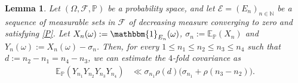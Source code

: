 \documentclass[11pt]{amsart}
\numberwithin{equation}{section}
\newtheorem{lemma}{Lemma}[section]
\theoremstyle{definition}
\theoremstyle{plain}
\newcommand{\N}{{\mathbb N}}
\begin{document}
\begin{lemma} Let $(\Omega,\mathcal{F},\mathbb{P})$ be a probability space, and let $\mathcal{E}=(E_n)_{n\in \N}$ be a sequence of measurable sets in $\mathcal{F}$ of decreasing measure converging to zero and satisfying \eqref{P}. Let $X_n(\omega):=\mathbbm{1}_{E_n}(\omega)$, $\sigma_n:=\mathbb{E}_{\mathbb{P}}(X_n)$ and $Y_n(\omega):=X_n(\omega)-\sigma_n$. Then, for every $1\leq n_1\leq n_2\leq n_3\leq n_4$ such that $d:=n_2-n_1=n_4-n_3$, we can estimate the $4$-fold covariance as
\begin{align*}
    \mathbb{E}_{\mathbb{P}}\left( Y_{n_1} Y_{n_2} Y_{n_3} Y_{n_4} \right)&\ll  \sigma_{n_1}\rho(d)\Big(\sigma_{n_1}+\rho(n_3-n_2)\Big).
\end{align*}\label{key}
\end{lemma}
\end{document}
